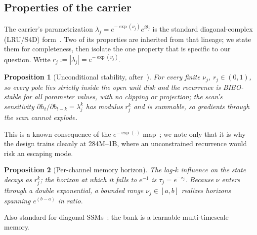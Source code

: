 \documentclass[journal]{IEEEtran}
\newtheorem{proposition}{Proposition}
\begin{document}
\subsection{Properties of the carrier}
\label{sec:properties}
The carrier's parametrization $\lambda_j = e^{-\exp(\nu_j)}e^{i\theta_j}$ is the standard diagonal-complex (LRU/S4D) form~\cite{orvieto2023lru,gu2022s4d}. Two of its properties are inherited from that lineage; we state them for completeness, then isolate the one property that is specific to our question. Write $r_j := |\lambda_j| = e^{-\exp(\nu_j)}$.

\begin{proposition}[Unconditional stability, after~\cite{orvieto2023lru,gu2022s4d}]
For every finite $\nu_j$, $r_j\in(0,1)$, so every pole lies strictly inside the open unit disk and the recurrence is BIBO-stable for all parameter values, with no clipping or projection; the scan's sensitivity $\partial h_t/\partial b_{t-k}=\lambda_j^k$ has modulus $r_j^k$ and is summable, so gradients through the scan cannot explode.
\end{proposition}
\noindent This is a known consequence of the $e^{-\exp(\cdot)}$ map~\cite{orvieto2023lru}; we note only that it is why the design trains cleanly at 284M--1B, where an unconstrained recurrence would risk an escaping mode.

\begin{proposition}[Per-channel memory horizon]
The lag-$k$ influence on the state decays as $r_j^k$; the horizon at which it falls to $e^{-1}$ is $\tau_j = e^{-\nu_j}$. Because $\nu$ enters through a double exponential, a bounded range $\nu_j\in[a,b]$ realizes horizons spanning $e^{(b-a)}$ in ratio.
\end{proposition}
\noindent Also standard for diagonal SSMs~\cite{gu2022s4d}: the bank is a learnable multi-timescale memory.
\end{document}
